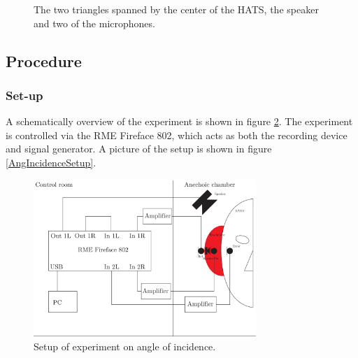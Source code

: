 \begin{figure}[H]
\label{Fig:AngleOfIcidenceTriangleCalculation}
\caption{The two triangles spanned by the center of the HATS, the speaker and two of the microphones.}
\end{figure}  

\subsection{Procedure}
\subsubsection{Set-up}
A schematically overview of the experiment is shown in figure \ref{Fig:AngleOfIncidenceSetup}. The experiment is controlled via the RME Fireface 802, which acts as both the recording device and signal generator. A picture of the setup is shown in figure \ref{AngIncidenceSetup}.

\begin{figure}[H]
	\centering
	\includegraphics[width=0.75\textwidth]{../Journal/Experiments/AngleOfIncidence/AngleOfIncidenceSetup.pdf}
	\caption{Setup of experiment on angle of incidence.}
	\label{Fig:AngleOfIncidenceSetup}
\end{figure}

